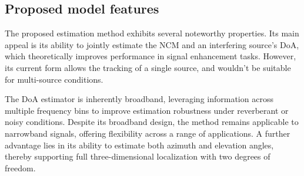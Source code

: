 %
%
%
\subsection{Proposed model features}

The proposed estimation method exhibits several noteworthy properties. Its main appeal is its ability to jointly estimate the NCM and an interfering source's DoA, which theoretically improves performance in signal enhancement tasks. However, its current form allows the tracking of a single source, and wouldn't be suitable for multi-source conditions.

The DoA estimator is inherently broadband, leveraging information across multiple frequency bins to improve estimation robustness under reverberant or noisy conditions. Despite its broadband design, the method remains applicable to narrowband signals, offering flexibility across a range of applications. A further advantage lies in its ability to estimate both azimuth and elevation angles, thereby supporting full three-dimensional localization with two degrees of freedom.

